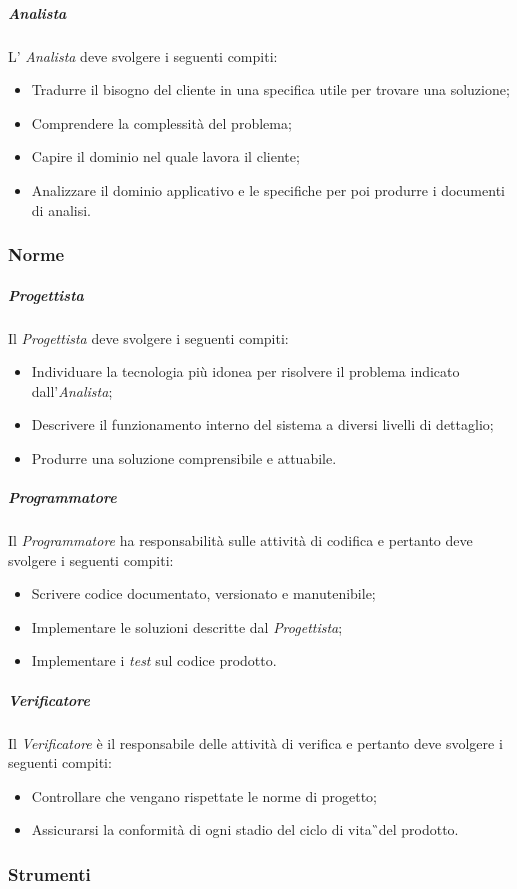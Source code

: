\subparagraph{Analista} L' \textit{Analista} deve svolgere i seguenti compiti:
\begin{itemize}
\item Tradurre il bisogno del cliente in una specifica utile per trovare una soluzione;
\item Comprendere la complessità del problema;
\item Capire il dominio nel quale lavora il cliente;
\item Analizzare il dominio applicativo e le specifiche per poi produrre i documenti di analisi.
\end{itemize}
\subsubsection{Norme}

\subparagraph{Progettista} Il \textit{Progettista} deve svolgere i seguenti compiti:
\begin{itemize}
\item Individuare la tecnologia più idonea per risolvere il problema indicato dall'\textit{Analista};
\item Descrivere il funzionamento interno del sistema a diversi livelli di dettaglio;
\item Produrre una soluzione comprensibile e attuabile. 
\end{itemize}

\subparagraph{Programmatore} Il \textit{Programmatore} ha responsabilità sulle attività di codifica e pertanto deve svolgere i seguenti compiti:
\begin{itemize}
\item Scrivere codice documentato, versionato e manutenibile;
\item Implementare le soluzioni descritte dal \textit{Progettista};
\item Implementare i \textit{test} sul codice prodotto. 
\end{itemize}

\subparagraph{Verificatore} Il \textit{Verificatore} è il responsabile delle attività di verifica e pertanto deve svolgere i seguenti compiti:
\begin{itemize}
\item Controllare che vengano rispettate le norme di progetto;
\item Assicurarsi la conformità di ogni stadio del ciclo di vita\G\ del prodotto.
\end{itemize}

\subsubsection{Strumenti}

